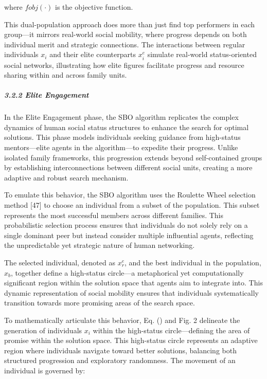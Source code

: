 \documentclass{article} %
\begin{document}
where $fobj\left(\cdot \right)$ is the objective function.

This dual-population approach does more than just find top performers in each group---it mirrors real-world social mobility, where progress depends on both individual merit and strategic connections. The interactions between regular individuals $x_i$ and their elite counterparts $x^e_i$ simulate real-world status-oriented social networks, illustrating how elite figures facilitate progress and resource sharing within and across family units.

\noindent 
\subparagraph{3.2.2 Elite Engagement}

In the Elite Engagement phase, the SBO algorithm replicates the complex dynamics of human social status structures to enhance the search for optimal solutions. This phase models individuals seeking guidance from high-status mentors---elite agents in the algorithm---to expedite their progress. Unlike isolated family frameworks, this progression extends beyond self-contained groups by establishing interconnections between different social units, creating a more adaptive and robust search mechanism.

To emulate this behavior, the SBO algorithm uses the Roulette Wheel selection method [47] to choose an individual from a subset of the population. This subset represents the most successful members across different families. This probabilistic selection process ensures that individuals do not solely rely on a single dominant peer but instead consider multiple influential agents, reflecting the unpredictable yet strategic nature of human networking.

The selected individual, denoted as $x^e_r$, and the best individual in the population, $x_b$, together define a high-status circle---a metaphorical yet computationally significant region within the solution space that agents aim to integrate into. This dynamic representation of social mobility ensures that individuals systematically transition towards more promising areas of the search space.

To mathematically articulate this behavior, Eq. \left(\right) and Fig. 2 delineate the generation of individuals $x_i$ within the high-status circle---defining the area of promise within the solution space. This high-status circle represents an adaptive region where individuals navigate toward better solutions, balancing both structured progression and exploratory randomness. The movement of an individual is governed by:
\end{document}
